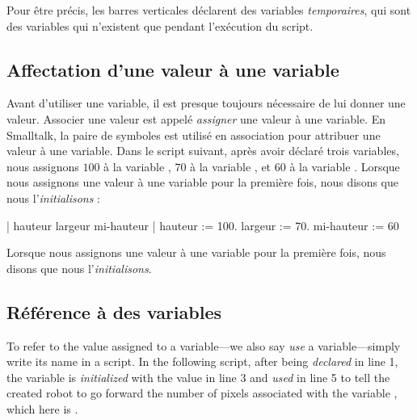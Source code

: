 \documentclass[a4paper,10pt,twoside]{book}
\begin{document}

Pour \^etre pr\'ecis, les barres verticales \ct{||} d\'eclarent des variables \emph{temporaires}, qui sont des variables qui n'existent que pendant l'ex\'ecution du script. 


\subsection{Affectation d'une valeur \`a une variable } 

Avant d'utiliser une variable, il est presque toujours n\'ecessaire de lui donner une valeur. Associer une valeur est appel\'e \emph{assigner} une valeur \`a une variable. En Smalltalk, la paire de symboles \ct{:=} est utilis\'e en association pour attribuer une valeur \`a une variable. Dans le script suivant, apr\`es avoir d\'eclar\'e trois variables, nous assignons $100$ \`a la variable , $70$ \`a la variable  , et $60$ \`a la variable . Lorsque nous assignons une valeur \`a une variable pour la premi\`ere fois, nous disons que nous l'\emph{initialisons} : 

\begin{code}{}
| hauteur largeur mi-hauteur | 
hauteur := 100. 
largeur := 70. 
mi-hauteur := 60 
\end{code}


Lorsque nous assignons une valeur \`a une variable pour la premi\`ere fois, nous disons que nous  l'\emph{initialisons}. 

\subsection{R\'ef\'erence \`a des variables } 

To refer to the value assigned to a variable---we also say \emph{use} a variable---simply write its name 
in a script. In the following script, after being \emph{declared} in line 1, the variable  is \emph{initialized} with the value  in line 3 and \emph{used} in line 5 to tell the created robot to go forward the number of pixels associated with the variable , which here is . 
\end{document}
